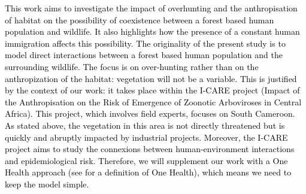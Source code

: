 \documentclass{article}
\newcommand{\YD}[1]{\textcolor{magenta}{#1}}
\newcommand{\vdeux}[1]{\textcolor{black}{#1}}
\newcommand{\vtrois}[1]{\textcolor{black}{#1}}
\theoremstyle{definition}
\theoremstyle{remark}
\begin{document}
\vtrois{
This work aims to investigate the impact of overhunting and the anthropisation of habitat on the possibility of coexistence between a forest based human population and wildlife. It also highlights how the presence of a constant human immigration affects this possibility.
} 
\vdeux{
The originality of the present study is to model direct interactions between a forest based human population and the surrounding wildlife. The focus is on over-hunting rather than on the anthropization of the habitat: vegetation will not be a variable.}
\vtrois{
This is justified by the context of our work: it takes place within the I-CARE project (Impact of the Anthropisation on the Risk of Emergence of Zoonotic Arboviroses in Central Africa). This project, which involves field experts, focuses on South Cameroon. As stated above, the vegetation in this area is not directly threatened but is quickly and abruptly impacted by industrial projects.
Moreover, the I-CARE project aims to study the connexions between human-environment interactions and epidemiological risk. Therefore, we will supplement our work with a One Health approach (see \cite{lerner_comparison_2017} for a definition of One Health), which means we need to keep the model simple.
}

\end{document}
